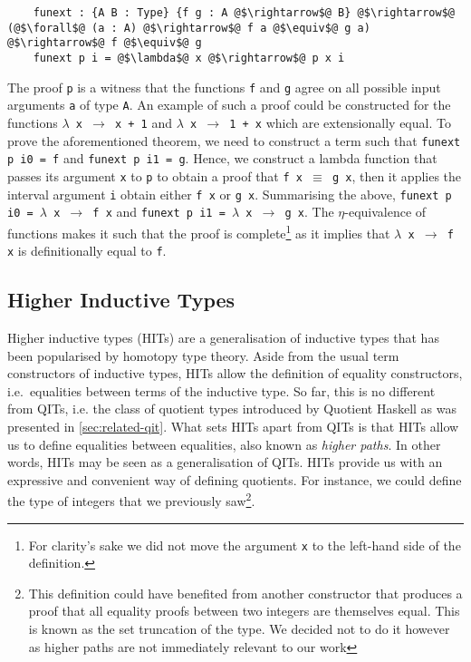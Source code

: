 \documentclass[12pt,twoside,maitrise]{dms}
\theoremstyle{definition}
\numberwithin{equation}{section}
\numberwithin{table}{chapter}
\numberwithin{figure}{chapter}
\newcommand\id[1] {\texttt{#1}}
\newcommand\fn[1] {\texttt{#1}}
\begin{document}
\begin{verbatim}
    funext : {A B : Type} {f g : A @$\rightarrow$@ B} @$\rightarrow$@ (@$\forall$@ (a : A) @$\rightarrow$@ f a @$\equiv$@ g a) @$\rightarrow$@ f @$\equiv$@ g
    funext p i = @$\lambda$@ x @$\rightarrow$@ p x i
\end{verbatim}

The proof \id{p} is a witness that the functions \id{f} and \id{g} agree on all
possible input arguments \id{a} of type \id{A}. An example of such a proof could
be constructed for the functions \fn{$\lambda$ x $\rightarrow$ x + 1} and
\fn{$\lambda$ x $\rightarrow$ 1 + x} which are extensionally equal. To prove the
aforementioned theorem, we need to construct a term such that \fn{funext p i0 =
  f} and \fn{funext p i1 = g}. Hence, we construct a lambda function that passes
its argument \id{x} to \id{p} to obtain a proof that \fn{f x $\equiv$ g x}, then
it applies the interval argument \id{i} obtain either \fn{f x} or \fn{g x}.
Summarising the above, \fn{funext p i0 = $\lambda$ x $\rightarrow$ f x} and
\fn{funext p i1 = $\lambda$ x $\rightarrow$ g x}. The $\eta$-equivalence of
functions makes it such that the proof is complete\footnote{For clarity's sake
we did not move the argument \id{x} to the left-hand side of the definition.} as
it implies that \fn{$\lambda$ x $\rightarrow$ f x} is definitionally equal to
\id{f}.



\subsection{Higher Inductive Types}

Higher inductive types (HITs) are a generalisation of inductive types that has
been popularised by homotopy type theory\cite{HoTTbook}. Aside from the usual
term constructors of inductive types, HITs allow the definition of equality
constructors, i.e.\ equalities between terms of the inductive type. So far,
this is no different from QITs, i.e. the class of quotient types introduced by
Quotient Haskell as was presented in \autoref{sec:related-qit}. What sets HITs
apart from QITs is that HITs allow us to define equalities between equalities,
also known as \emph{higher paths}. In other words, HITs may be seen as a
generalisation of QITs. HITs provide us with an expressive and convenient way
of defining quotients. For instance, we could define the type of integers that
we previously saw\footnote{This definition could have benefited from another
constructor that produces a proof that all equality proofs between two
integers are themselves equal. This is known as the set truncation of the
type. We decided not to do it however as higher paths are not immediately
relevant to our work}.
\end{document}
